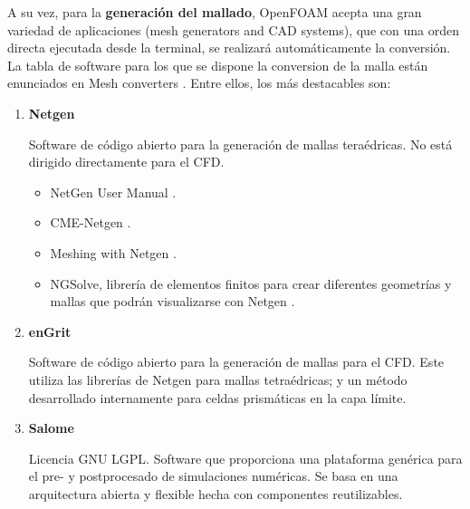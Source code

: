 A su vez, para la \textbf{generación del mallado}, OpenFOAM acepta una gran variedad de aplicaciones (mesh generators and CAD systems), que con una orden directa
ejecutada desde la terminal, se realizará automáticamente la conversión. La tabla de software para los que se
dispone la conversion de la malla están enunciados en Mesh converters \cite{conversion}. Entre ellos, los más destacables son:

\begin{enumerate}
\def\labelenumi{\arabic{enumi}.}
\item
  \textbf{Netgen} \cite{Netgen}

Software de código abierto para la generación de mallas teraédricas. No
está dirigido directamente para el CFD.

\begin{itemize}
\item
  NetGen User Manual \cite{netgenusermanual}.
\item
  CME-Netgen \cite{ascNetgen}.
\item
  Meshing with Netgen \cite{Meshing_with_Netgen}.
\item
  NGSolve, librería de elementos finitos para crear diferentes
  geometrías y mallas que podrán visualizarse con Netgen \cite{NGSolve}.
\end{itemize}

\item
  \textbf{enGrit} \cite{enGrit}

Software de código abierto para la generación de mallas para el CFD.
Este utiliza las librerías de Netgen para mallas tetraédricas; y un
método desarrollado internamente para celdas prismáticas en la capa
límite.

\item
  \textbf{Salome} \cite{Salome}


Licencia GNU LGPL. Software que proporciona una plataforma genérica para
el pre- y postprocesado de simulaciones numéricas. Se basa en una
arquitectura abierta y flexible hecha con componentes reutilizables.



\end{enumerate}

